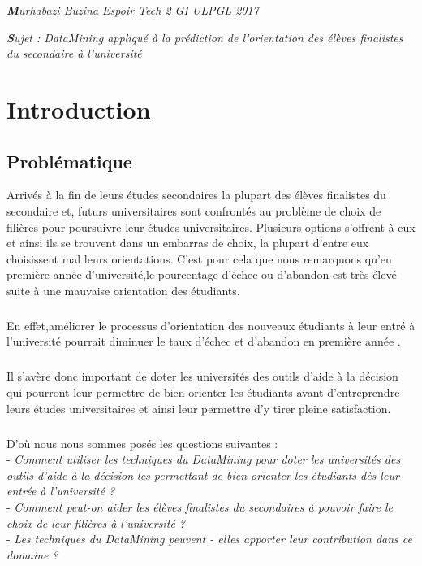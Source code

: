 \begin{center}
	\textit{ \textbf Murhabazi Buzina Espoir Tech 2 GI ULPGL 2017}
\end{center}
\begin{center}
	 \textit{ \textbf Sujet : DataMining appliqué à la prédiction de l'\textbf{}orientation des élèves finalistes du secondaire à l'université }
\end{center}
\chapter*{Introduction}
\section{Problématique}
Arrivés à la fin de leurs études secondaires la plupart des élèves finalistes du secondaire et, futurs universitaires sont confrontés au problème de choix de filières pour poursuivre leur études universitaires.
Plusieurs options s'offrent à eux et ainsi ils se trouvent dans un embarras de choix, la plupart d'entre eux choisissent mal leurs orientations.
C'est pour cela que nous remarquons qu'en première année d'université,le pourcentage d'échec ou d'abandon est très élevé suite à une mauvaise orientation des étudiants.\cite{Articl1Mr} 
\paragraph{}
En effet,améliorer le processus d'orientation des nouveaux étudiants à leur entré à l'université pourrait diminuer le taux d'échec et d'abandon en première année .
\paragraph{}
Il s'avère donc important de doter les universités des outils d'aide à la décision qui pourront leur permettre de bien orienter les étudiants avant d'entreprendre leurs études universitaires et ainsi leur permettre d'y tirer pleine satisfaction.  
\paragraph{}
D'où nous nous sommes posés les questions suivantes : \\
- \emph{Comment utiliser les techniques  du DataMining pour doter les universités des outils d'aide à la décision les permettant de bien orienter les étudiants dès leur entrée à l'université ?  }\\
- \emph{Comment peut-on aider les élèves finalistes du secondaires  à pouvoir faire le choix de leur filières à l'université ? }\\
- \emph{Les techniques du DataMining peuvent - elles apporter leur contribution dans ce domaine ? }
